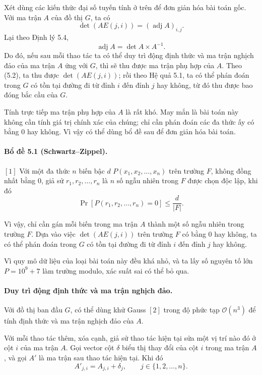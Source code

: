 \documentclass[11pt]{article}
\newcommand{\Oh}{\mathcal{O}}
\begin{document}
Xét dùng các kiến thức đại số tuyến tính ở trên để đơn giản hóa bài toán gốc.
Với ma trận \(A\) của đồ thị \(G\), ta có
\[
  \det(AE(j,i))=(\operatorname{adj} A)_{i,j}. \tag{5.2}
\]
Lại theo Định lý 5.4,
\[
  \operatorname{adj} A=\det A\times A^{-1}.
\]
Do đó, nếu sau mỗi thao tác ta có thể duy trì động định thức và ma trận nghịch
đảo của ma trận \(A\) ứng với \(G\), thì sẽ thu được ma trận phụ hợp của
\(A\). Theo (5.2), ta thu được \(\det(AE(j,i))\); rồi theo Hệ quả 5.1, ta có
thể phán đoán trong \(G\) có tồn tại đường đi từ đỉnh \(i\) đến đỉnh \(j\) hay
không, từ đó thu được bao đóng bắc cầu của \(G\).

Tính trực tiếp ma trận phụ hợp của \(A\) là rất khó. May mắn là bài toán này
không cần tính giá trị chính xác của chúng; chỉ cần phán đoán các đa thức ấy
có bằng \(0\) hay không. Vì vậy có thể dùng bổ đề sau để đơn giản hóa bài
toán.

\paragraph{Bổ đề 5.1 (Schwartz--Zippel).}
\([1]\)
Với một đa thức \(n\) biến bậc \(d\) \(P(x_1,x_2,\ldots,x_n)\) trên trường
\(F\), không đồng nhất bằng \(0\), giả sử \(r_1,r_2,\ldots,r_n\) là \(n\) số
ngẫu nhiên trong \(F\) được chọn độc lập, khi đó
\[
  \Pr[P(r_1,r_2,\ldots,r_n)=0]\le \frac{d}{|F|}.
\]

Vì vậy, chỉ cần gán mỗi biến trong ma trận \(A\) thành một số ngẫu nhiên trong
trường \(F\). Dựa vào việc \(\det(AE(j,i))\) trên trường \(F\) có bằng \(0\)
hay không, ta có thể phán đoán trong \(G\) có tồn tại đường đi từ đỉnh \(i\)
đến đỉnh \(j\) hay không.

Vì quy mô dữ liệu của loại bài toán này đều khá nhỏ, và ta lấy số nguyên tố
lớn \(P=10^9+7\) làm trường modulo, xác suất sai có thể bỏ qua.

\paragraph{Duy trì động định thức và ma trận nghịch đảo.}
Với đồ thị ban đầu \(G\), có thể dùng khử Gauss \([2]\) trong độ phức tạp
\(\Oh(n^3)\) để tính định thức và ma trận nghịch đảo của \(A\).

Với mỗi thao tác thêm, xóa cạnh, giả sử thao tác hiện tại sửa một vị trí nào
đó ở cột \(i\) của ma trận \(A\). Gọi vector cột \(\delta\) biểu thị thay đổi
của cột \(i\) trong ma trận \(A\), và gọi \(A'\) là ma trận sau thao tác hiện
tại. Khi đó
\[
  A'_{j,i}=A_{j,i}+\delta_j,\qquad j\in\{1,2,\ldots,n\}.
\]
\end{document}
